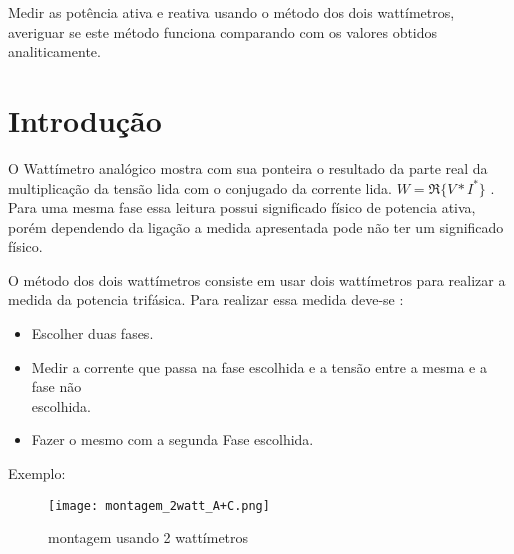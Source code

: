 \documentclass[a4paper, 12pt]{article}
\begin{document}
\justifying
    Medir as potência ativa e reativa usando o método dos dois wattímetros, averiguar se este método funciona comparando com os valores obtidos analiticamente.
\section{Introdução}

\justifying
  O Wattímetro analógico mostra com sua ponteira o resultado da parte real da multiplicação
  da tensão lida com o conjugado da corrente lida. \(W = \Re\{V \ast I^\ast\}\) . Para uma mesma fase essa leitura possui significado físico de potencia ativa, porém dependendo da ligação a medida apresentada pode não ter um significado físico.

  O método dos dois wattímetros consiste em usar dois wattímetros para realizar a medida da potencia trifásica. Para realizar essa medida deve-se :
    \begin{itemize}
        \item Escolher duas fases.
        \item Medir a corrente que passa na  fase escolhida e a tensão entre a mesma e a fase não \\ escolhida.
        \item Fazer o mesmo com a segunda Fase escolhida.
    \end{itemize}
    Exemplo:\\
    \begin{figure}[H]
            \centering %
            \texttt{[image: montagem\_2watt\_A+C.png]}
            \caption{montagem usando 2 wattímetros}
    \end{figure}
\end{document}
